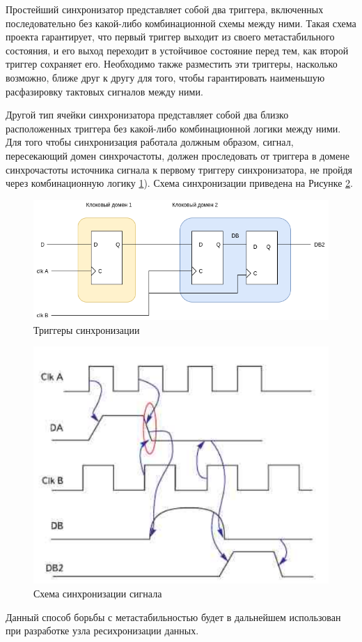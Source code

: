 Простейший синхронизатор представляет собой два триггера, включенных последовательно без какой-либо комбинационной схемы между ними. Такая схема проекта гарантирует, что первый триггер выходит из своего метастабильного состояния, и его выход переходит в устойчивое состояние перед тем, как второй триггер сохраняет его. Необходимо также разместить эти триггеры, насколько возможно, ближе друг к другу для того, чтобы гарантировать наименьшую расфазировку тактовых сигналов между ними. 

Другой тип ячейки синхронизатора представляет собой два близко расположенных триггера без какой-либо комбинационной логики между ними. Для того чтобы синхронизация работала должным образом, сигнал, пересекающий домен синхрочастоты, должен проследовать от триггера в домене синхрочастоты источника сигнала к первому триггеру синхронизатора, не пройдя через комбинационную логику \ref{fig:sync-triggers}). Схема синхронизации приведена на Рисунке \ref {fig:sync-scheme}.


\begin{figure}
	\centering
	\includegraphics[width=0.7\linewidth]{course-scheme/images/sync-triggers}
	\caption{Триггеры синхронизации}
	\label{fig:sync-triggers}
\end{figure}

\begin{figure}
	\centering
	\includegraphics[width=0.5\linewidth]{course-scheme/images/sync-scheme}
	\caption{Схема синхронизации сигнала}
	\label{fig:sync-scheme}
\end{figure}



Данный способ борьбы с метастабильностью будет в дальнейшем использован при разработке узла ресихронизации данных.
